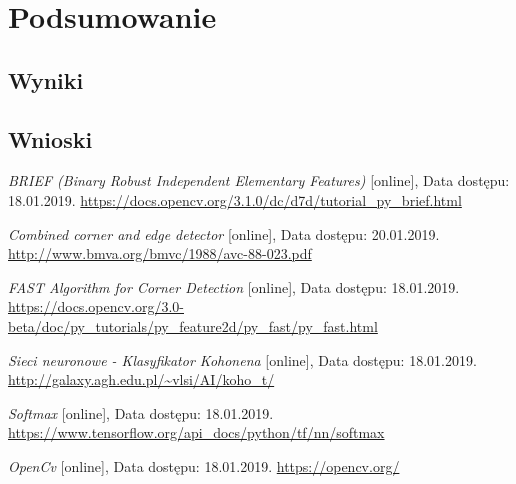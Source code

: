 \documentclass[12pt, notitlepage]{article}
\begin{document}
\section{Podsumowanie}

\subsection{Wyniki}

\subsection{Wnioski}

\newpage

\begin{thebibliography}{9}

\textit{BRIEF (Binary Robust Independent Elementary Features) } [online], Data dostępu: 18.01.2019. 
\newline\url{https://docs.opencv.org/3.1.0/dc/d7d/tutorial_py_brief.html}

\textit{Combined corner and edge detector } [online], Data dostępu: 20.01.2019. 
\newline\url{http://www.bmva.org/bmvc/1988/avc-88-023.pdf}

\textit{FAST Algorithm for Corner Detection} [online], Data dostępu: 18.01.2019. 
\newline\url{https://docs.opencv.org/3.0-beta/doc/py_tutorials/py_feature2d/py_fast/py_fast.html}

\textit{Sieci neuronowe - Klasyfikator Kohonena} [online], Data dostępu: 18.01.2019. 
\newline\url{http://galaxy.agh.edu.pl/~vlsi/AI/koho_t/}

\textit{Softmax} [online], Data dostępu: 18.01.2019. 
\newline\url{https://www.tensorflow.org/api_docs/python/tf/nn/softmax}

\textit{OpenCv} [online], Data dostępu: 18.01.2019. 
\newline\url{https://opencv.org/}

\end{thebibliography} 





\end{document}
